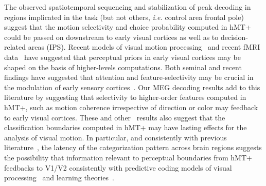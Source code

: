 The observed spatiotemporal sequencing and stabilization of peak decoding in regions implicated in the task (but not others, \textit{i.e.} control area frontal pole) suggest that the motion selectivity and choice probability computed in hMT+ could be passed on downstream to early visual cortices as well as to decision-related areas (IPS). Recent models of visual motion processing~\cite{4rust2006mt} and recent fMRI data~\cite{18vintch2014cortical} have suggested that perceptual priors in early visual cortices may be shaped on the basis of higher-levels computations. Both seminal and recent findings have suggested that attention and feature-selectivity may be crucial in the modulation of early sensory cortices~\cite{5kamitani2005decoding,14serences2007representation,32saproo2014attention}. Our MEG decoding results add to this literature by suggesting that selectivity to higher-order features computed in hMT+, such as motion coherence irrespective of direction or color may feedback to early visual cortices. These and other~\cite{15hogendoorn2013decoding,16van2014decoding} results also suggest that the classification boundaries computed in hMT+ may have lasting effects for the analysis of visual motion. In particular, and consistently with previous literature~\cite{5kamitani2005decoding,13kamitani2006decoding,14serences2007representation,15hogendoorn2013decoding,16van2014decoding}, the latency of the categorization pattern across brain regions suggests the possibility that information relevant to perceptual boundaries from hMT+ feedbacks to V1/V2 consistently with predictive coding models of visual processing~\cite{4rust2006mt,25rao1999predictive} and learning theories~\cite{26ahissar2004reverse,27gilbert2009perceptual,28sasaki2010advances,29roelfsema2010perceptual}.

